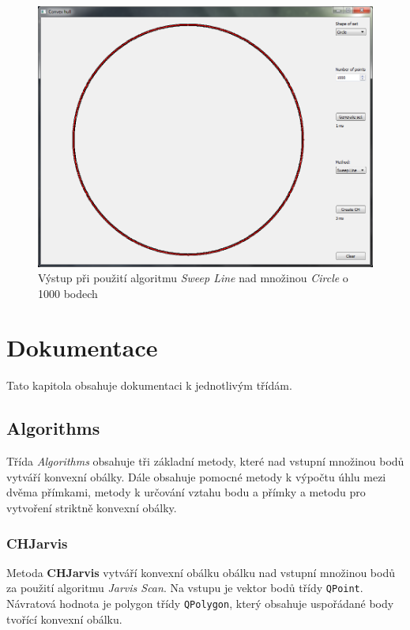 \documentclass[a4paper, 12pt]{article}
\begin{document}
\begin{figure}[h!]
	\centering
	\includegraphics[width=13cm]{./pictures/app_circle_sweep.png}
	\caption{Výstup při použití algoritmu \textit{Sweep Line} nad množinou \textit{Circle} o 1000 bodech}
\end{figure}

\clearpage
 
\section{Dokumentace}
Tato kapitola obsahuje dokumentaci k jednotlivým třídám.

\subsection{Algorithms}
Třída \textit{Algorithms} obsahuje tři základní metody, které nad vstupní množinou bodů vytváří konvexní obálky. Dále obsahuje pomocné metody k výpočtu úhlu mezi dvěma přímkami, metody k určování vztahu bodu a přímky a metodu pro vytvoření striktně konvexní obálky.

\subsubsection*{CHJarvis}
Metoda \textbf{CHJarvis} vytváří konvexní obálku obálku nad vstupní množinou bodů za použití algoritmu \textit{Jarvis Scan}. Na vstupu je vektor bodů třídy \texttt{QPoint}. Návratová hodnota je polygon třídy \texttt{QPolygon}, který obsahuje uspořádané body tvořící konvexní obálku.\\
\end{document}
